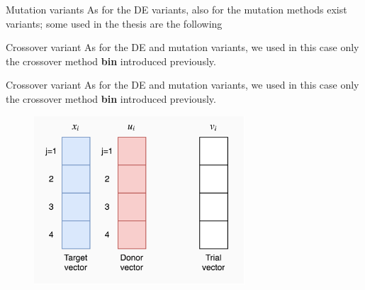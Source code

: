 \documentclass[xcolor={usenames}]{beamer}
\begin{document}
  \begin{frame}{Mutation variants}
  	As for the DE variants, also for the mutation methods exist variants; some used in the thesis are the following
  	\begin{itemize}
	\end{itemize}  	 
  \end{frame}
  \begin{frame}{Crossover variant}
	As for the DE and mutation variants, we used in this case only the crossover method \textbf{bin} introduced previously.
  \end{frame}
  \begin{frame}{Crossover variant}
	As for the DE and mutation variants, we used in this case only the crossover method \textbf{bin} introduced previously.
	\begin{figure}
		\centering
		\includegraphics[width=0.7\textwidth]{../figures/bin-0.png}
	\end{figure}
  \end{frame}
  
\end{document}
